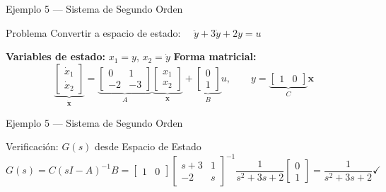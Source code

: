 \documentclass[aspectratio=169,xcolor=dvipsnames]{beamer}
\begin{document}
\begin{frame}{Ejemplo 5 --- Sistema de Segundo Orden}
    \begin{exampleblock}{Problema}
        Convertir a espacio de estado: $\quad \ddot{y} + 3\dot{y} + 2y = u$
    \end{exampleblock}
    \vspace{0.3em}
    \textbf{Variables de estado:} $x_1 = y$, $x_2 = \dot{y}$
    \vspace{0.3em}
    \textbf{Forma matricial:}
    \begin{equation}
        \underbrace{\begin{bmatrix} \dot{x}_1 \\ \dot{x}_2 \end{bmatrix}}_{\dot{\mathbf{x}}}
        =
        \underbrace{\begin{bmatrix} 0 & 1 \\ -2 & -3 \end{bmatrix}}_{A}
        \underbrace{\begin{bmatrix} x_1 \\ x_2 \end{bmatrix}}_{\mathbf{x}}
        +
        \underbrace{\begin{bmatrix} 0 \\ 1 \end{bmatrix}}_{B} u, \qquad
        y = \underbrace{\begin{bmatrix} 1 & 0 \end{bmatrix}}_{C} \mathbf{x}
    \end{equation}
\end{frame}
\begin{frame}{Ejemplo 5 --- Sistema de Segundo Orden}
    \begin{block}{Verificaci\'on: $G(s)$ desde Espacio de Estado}
        \[
            G(s) = C(sI-A)^{-1}B = \begin{bmatrix}1&0\end{bmatrix}
            \begin{bmatrix}s+3 & 1 \\ -2 & s\end{bmatrix}^{-1} \frac{1}{s^2+3s+2}
            \begin{bmatrix}0\\1\end{bmatrix} = \frac{1}{s^2+3s+2} \checkmark
        \]
    \end{block}
\end{frame}
\end{document}

